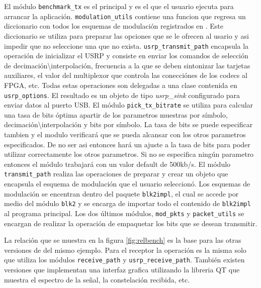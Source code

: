 El m\'odulo \verb|benchmark_tx| es el principal y es el que el usuario ejecuta para arrancar la
aplicaci\'on. \verb|modulation_utils| contiene una funcion que regresa un diccionario con todos los
esquemas de modulaci\'on registrados en \gnuradio. Este diccionario se utiliza para preparar las
opciones que se le ofrecen al usario y asi impedir que no seleccione una que no exista.
\verb|usrp_transmit_path| encapsula la operaci\'on de inicializar el USRP y consiste en enviar los
comandos de selecci\'on de decimaci\'on\textbackslash interpolaci\'on, frecuencia a la que se deben
sintonizar las tarjetas auxiliares, el valor del multiplexor que controla las conecci\'ones de los codecs al FPGA,
etc. Todas estas operaciones son delegadas a una clase contenida en \verb|usrp_options|. El
resultado es un objeto de tipo \emph{usrp\_sink} configurado para enviar datos al puerto USB. El
m\'odulo \verb|pick_tx_bitrate| se utiliza para calcular una tasa de bits \'optima apartir de los
parametros muestras por s\'imbolo, decimaci\'on\textbackslash interpolaci\'on y bits por s\'imbolo.
La tasa de bits se puede especificar tambien y el modulo verificar\'a que se pueda alcansar con los otros
parametros especificados. De no ser asi entonces har\'a un ajuste a la tasa de bits para poder
utilizar correctamente los otros parametros. Si no se especifica ning\'un parametro entonces el
m\'odulo trabajar\'a con un valor default de 500kb/s.
El m\'odulo \verb|transmit_path| realiza las operaciones de preparar y crear un objeto que encapsula
el esquema de modulaci\'on que el usuario seleccion\'o. Los esquemas de modulaci\'on se encentran
dentro del paquete \verb|blk2impl|, el cual se accede por medio del m\'odulo \verb|blk2| y se
encarga de importar todo el contenido de \verb|blk2impl| al programa principal. Los dos \'ultimos
m\'odulos, \verb|mod_pkts| y \verb|packet_utils| se encargan de realizar la operaci\'on de
empaquetar los bits que se desean transmitir.

La relaci\'on que se muestra en la figura \ref{fig:relbench} es la base para las otras versiones de
del mismo ejemplo. Para el receptor la operaci\'on es la misma solo que utiliza los m\'odulos
\verb|receive_path| y \verb|usrp_receive_path|. Tambi\'en existen versiones que implementan una
interfaz grafica utilizando la libreria QT que muestra el espectro de la se\~nal, la constelaci\'on
recibida, etc.

